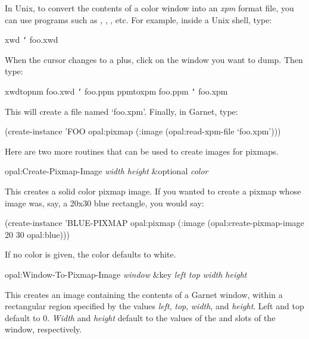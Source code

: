 In Unix, to convert the contents of a color window into an {\it xpm} format
file, you can use programs such as , , ,
etc.  For example, inside a Unix shell, type:

\begin{programexample}
xwd {\tt\char`\>} foo.xwd
\end{programexample}

When the cursor changes to a plus, click on the window you want to dump.
Then type:

  
\begin{programexample}
xwdtopnm foo.xwd {\tt\char`\>} foo.ppm
ppmtoxpm foo.ppm {\tt\char`\>} foo.xpm
\end{programexample}

This will create a file named `foo.xpm'. %
Finally, in Garnet, type:

\begin{programexample}
(create-instance 'FOO opal:pixmap
   (:image (opal:read-xpm-file `foo.xpm')))
\end{programexample}


Here are two more routines that can be used to create images for pixmaps.

\begin{programexample}
opal:Create-Pixmap-Image {\it width height} \&optional {\it color} \value{Function}
\end{programexample}
This creates a solid color pixmap image.  If you wanted to create a
pixmap whose image was, say, a 20x30 blue rectangle, you
would say:

\begin{programexample}
(create-instance 'BLUE-PIXMAP opal:pixmap
   (:image (opal:create-pixmap-image 20 30 opal:blue)))
\end{programexample}

If no color is given, the color defaults to white.

\begin{programexample}
opal:Window-To-Pixmap-Image {\it window} \&key {\it left top width height} \value{Function}
\end{programexample}
This creates an image containing the contents of a Garnet window,
within a rectangular region specified by the values {\it left},
{\it top}, {\it width}, and {\it height}.  Left and top default to 0.
{\it Width} and {\it height} default to the values of the  and
 slots of the window, respectively.


